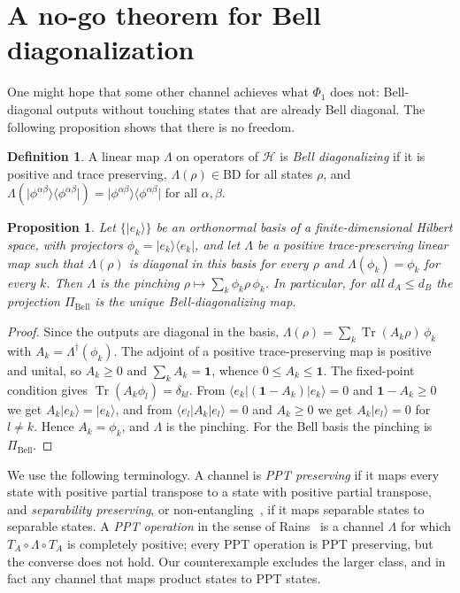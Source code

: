 \documentclass[11pt,a4paper]{article}
\newtheorem{proposition}[theorem]{Proposition}
\theoremstyle{definition}
\newtheorem{definition}[theorem]{Definition}
\theoremstyle{remark}
\newcommand{\ket}[1]{\lvert #1\rangle}
\newcommand{\bra}[1]{\langle #1\rvert}
\newcommand{\ketbra}[2]{\lvert #1\rangle\langle #2\rvert}
\newcommand{\dA}{d_A}
\newcommand{\dB}{d_B}
\newcommand{\PiB}{\Pi_{\mathrm{Bell}}}
\newcommand{\tr}{\operatorname{Tr}}
\newcommand{\id}{\mathbf{1}}
\newcommand{\BD}{\mathrm{BD}}
\newcommand{\phib}[2]{\phi^{#1#2}}
\begin{document}
\section{A no-go theorem for Bell diagonalization}

One might hope that some other channel achieves what $\Phi_1$ does not: Bell-diagonal
outputs without touching states that are already Bell diagonal. The following proposition
shows that there is no freedom.

\begin{definition}\label{def:bd}
A linear map $\Lambda$ on operators of $\mathcal{H}$ is \emph{Bell diagonalizing} if it is
positive and trace preserving, $\Lambda(\rho)\in\BD$ for all states $\rho$, and
$\Lambda(\ketbra{\phib\alpha\beta}{\phib\alpha\beta})=\ketbra{\phib\alpha\beta}{\phib\alpha\beta}$
for all $\alpha,\beta$.
\end{definition}

\begin{proposition}\label{prop:unique}
Let $\{\ket{e_k}\}$ be an orthonormal basis of a finite-dimensional Hilbert space, with
projectors $\phi_k=\ketbra{e_k}{e_k}$, and let $\Lambda$ be a positive trace-preserving
linear map such that $\Lambda(\rho)$ is diagonal in this basis for every $\rho$ and
$\Lambda(\phi_k)=\phi_k$ for every $k$. Then $\Lambda$ is the pinching
$\rho\mapsto\sum_k\phi_k\rho\,\phi_k$. In particular, for all $\dA\le\dB$ the projection
$\PiB$ is the unique Bell-diagonalizing map.
\end{proposition}

\begin{proof}
Since the outputs are diagonal in the basis,
$\Lambda(\rho)=\sum_k\tr(A_k\rho)\,\phi_k$ with $A_k=\Lambda^{\dagger}(\phi_k)$. The adjoint of a positive trace-preserving map is positive
and unital, so $A_k\ge0$ and $\sum_kA_k=\id$, whence $0\le A_k\le\id$. The fixed-point
condition gives $\tr(A_k\phi_l)=\delta_{kl}$. From $\bra{e_k}(\id-A_k)\ket{e_k}=0$
and $\id-A_k\ge0$ we get $A_k\ket{e_k}=\ket{e_k}$, and from
$\bra{e_l}A_k\ket{e_l}=0$ and $A_k\ge0$ we get $A_k\ket{e_l}=0$ for $l\neq k$.
Hence $A_k=\phi_k$, and $\Lambda$ is the pinching. For the Bell basis the pinching is
$\PiB$.
\end{proof}

We use the following terminology. A channel is \emph{PPT preserving} if it maps every
state with positive partial transpose to a state with positive partial transpose, and
\emph{separability preserving}, or non-entangling~\cite{BP08}, if it maps separable
states to separable states. A \emph{PPT operation} in the sense of Rains~\cite{Rains01}
is a channel $\Lambda$ for which $T_A\circ\Lambda\circ T_A$ is completely positive; every
PPT operation is PPT preserving, but the converse does not hold. Our counterexample
excludes the larger class, and in fact any channel that maps product states to PPT
states.
\end{document}
